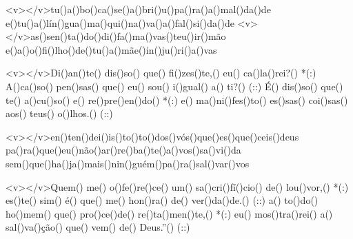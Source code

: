 <v></v>tu()a()bo()ca()se()a()bri()u()pa()ra()a()mal()da()de
e()tu()a()lín()gua()ma()qui()na()va()a()fal()si()da()de
<v></v>as()sen()ta()do()di()fa()ma()vas()teu()ir()mão
e()a()o()fi()lho()de()tu()a()mãe()in()ju()ri()a()vas

<v></v>Di()an()te() dis()so() que() fi()zes()te,() eu() ca()la()rei?() *(:)
A()ca()so() pen()sas() que() eu() sou() i()gual() a() ti?() (::)
É() dis()so() que() te() a()cu()so() e() re()pre()en()do() *(:)
e() ma()ni()fes()to() es()sas() coi()sas() aos() teus() o()lhos.() (::)

<v></v>en()ten()dei()is()to()to()dos()vós()que()es()que()ceis()deus
pa()ra()que()eu()não()ar()re()ba()te()a()vos()sa()vi()da
sem()que()ha()ja()mais()nin()guém()pa()ra()sal()var()vos

<v></v>Quem() me() o()fe()re()ce() um() sa()cri()fí()cio() de() lou()vor,() *(:)
es()te() sim() é() que() me() hon()ra() de() ver()da()de.() (::)
a() to()do() ho()mem() que() pro()ce()de() re()ta()men()te,() *(:)
eu() mos()tra()rei() a() sal()va()ção() que() vem() de() Deus.''() (::)